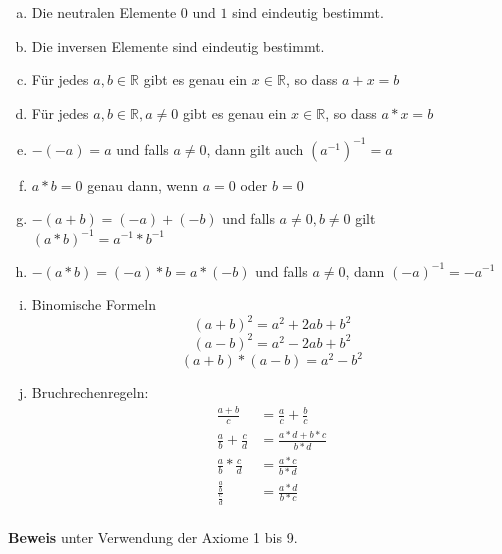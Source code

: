 \documentclass{article}
\begin{document}
\begin{enumerate}[(a)]
\item Die neutralen Elemente $0$ und $1$ sind eindeutig bestimmt.
\item Die inversen Elemente sind eindeutig bestimmt.
\item Für jedes $a,b \in \mathbb{R}$ gibt es genau ein $x \in \mathbb{R}$, so dass $a + x = b$
\item Für jedes $a,b \in \mathbb{R}, a \ne 0$ gibt es genau ein $x \in \mathbb{R}$, so dass
  $a * x = b$
\item $-(-a) = a$ und falls $a \ne 0$, dann gilt auch $(a^{-1})^{-1} = a$
\item $a * b = 0$ genau dann, wenn $a = 0$ oder $b = 0$
\item $-(a + b) = (-a) + (-b)$ und falls $a \ne 0, b \ne 0$ gilt $(a * b)^{-1} = a^{-1} * b^{-1}$
\item $-(a*b) = (-a) * b = a * (-b)$ und falls $a \ne 0$, dann $(-a)^{-1} = -a^{-1}$
\item Binomische Formeln
  \[
    (a + b)^2 = a^2 + 2ab + b^2
  \]
  \[
    (a - b)^2 = a^2 - 2ab + b^2
  \]
  \[
    (a + b) * (a - b) = a^2 - b^2
  \]
\item Bruchrechenregeln:
  \begin{align*}
    \frac{a + b}{c} &= \frac{a}{c} + \frac{b}{c} \\
    \frac{a}{b} + \frac{c}{d} &= \frac{a * d + b * c}{b * d} \\
    \frac{a}{b} * \frac{c}{d} &= \frac{a * c}{b * d} \\
    \frac{\frac{a}{b}}{\frac{c}{d}} &= \frac{a * d}{b * c} \\
  \end{align*}
\end{enumerate}

\textbf{Beweis} unter Verwendung der Axiome 1 bis 9.
\end{document}
